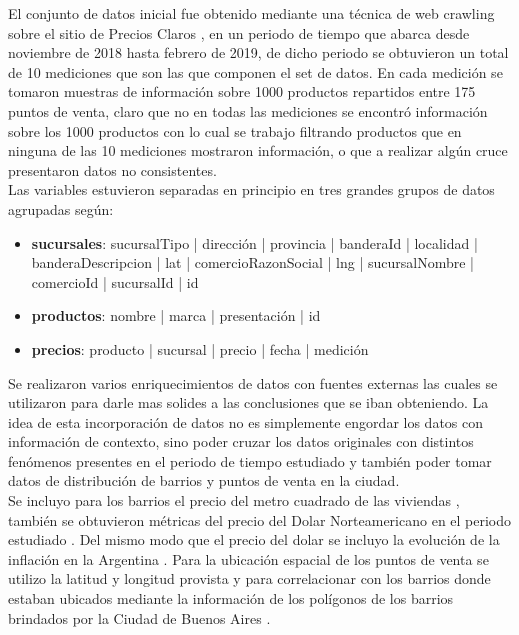 
El conjunto de datos inicial fue obtenido mediante una técnica de web crawling sobre el sitio de Precios Claros \cite{preciosClaros},  en un periodo de tiempo que abarca desde noviembre de 2018 hasta febrero de 2019, de dicho periodo se obtuvieron un total de 10 mediciones que son las que componen el set de datos. En cada medición se tomaron muestras de información sobre 1000 productos repartidos entre 175 puntos de venta, claro que no en todas las mediciones se encontró información sobre los 1000 productos con lo cual se trabajo filtrando productos que en ninguna de las 10 mediciones mostraron información, o que a realizar algún cruce presentaron datos no consistentes.\\
Las variables estuvieron separadas en principio en tres grandes grupos de datos agrupadas según:

\begin{itemize}
	\item \textbf{sucursales}: sucursalTipo | dirección | provincia | banderaId | localidad | banderaDescripcion | lat |  comercioRazonSocial | lng | sucursalNombre | comercioId | sucursalId | id 
    \item \textbf{productos}: nombre | marca | presentación | id 
    \item \textbf{precios}: producto | sucursal | precio | fecha | medición
\end{itemize}


Se realizaron varios enriquecimientos de datos con fuentes externas las cuales se utilizaron para darle mas solides a las conclusiones que se iban obteniendo. 
La idea de esta incorporación de datos no es simplemente engordar los datos con información de contexto, sino poder cruzar los datos originales con distintos fenómenos presentes en el periodo de tiempo estudiado y también poder tomar datos de distribución de barrios y puntos de venta en la ciudad.\\
Se incluyo para los barrios el precio del metro cuadrado de las viviendas \cite{Properati}, también se obtuvieron métricas del precio del Dolar Norteamericano en el periodo estudiado \cite{cotDolar}. Del mismo modo que el precio del dolar se incluyo la evolución de la inflación en la Argentina \cite{indec}. 
Para la ubicación espacial de los puntos de venta se utilizo la latitud y longitud provista y para correlacionar con los barrios donde estaban ubicados mediante la información de los polígonos de los barrios brindados por la Ciudad de Buenos Aires \cite{barriosGeoJSON}.




